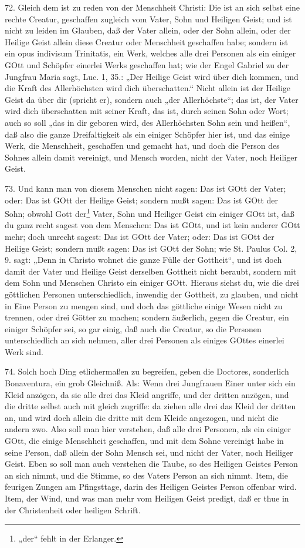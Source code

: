 72. Gleich dem ist zu reden von der Menschheit Christi: Die ist an sich selbst eine rechte Creatur, geschaffen zugleich vom Vater, Sohn und Heiligen Geist; und ist nicht zu leiden im Glauben, daß der Vater allein, oder der Sohn allein, oder der Heilige Geist allein diese Creatur oder Menschheit geschaffen habe; sondern ist ein opus indivisum Trinitatis, ein Werk, welches alle drei Personen als ein einiger GOtt und Schöpfer einerlei Werks geschaffen hat; wie der Engel Gabriel zu der Jungfrau Maria sagt, Luc. 1, 35.: „Der Heilige Geist wird über dich kommen, und die Kraft des Allerhöchsten wird dich überschatten.“ Nicht allein ist der Heilige Geist da über dir (spricht er), sondern auch „der Allerhöchste“; das ist, der Vater wird dich überschatten mit seiner Kraft, das ist, durch seinen Sohn oder Wort; auch so soll „das in dir geboren wird, des Allerhöchsten Sohn sein und heißen“, daß also die ganze Dreifaltigkeit als ein einiger Schöpfer hier ist, und das einige Werk, die Menschheit, geschaffen und gemacht hat, und doch die Person des Sohnes allein damit vereinigt, und Mensch worden, nicht der Vater, noch Heiliger Geist.

73. Und kann man von diesem Menschen nicht sagen: Das ist GOtt der Vater; oder: Das ist GOtt der Heilige Geist; sondern mußt sagen: Das ist GOtt der Sohn; obwohl Gott der\footnote{„der“ fehlt in der Erlanger.} Vater, Sohn und Heiliger Geist ein einiger GOtt ist, daß du ganz recht sagest von dem Menschen: Das ist GOtt, und ist kein anderer GOtt mehr; doch unrecht sagest: Das ist GOtt der Vater; oder: Das ist GOtt der Heilige Geist; sondern mußt sagen: Das ist GOtt der Sohn; wie St. Paulus Col. 2, 9. sagt: „Denn in Christo wohnet die ganze Fülle der Gottheit“, und ist doch damit der Vater und Heilige Geist derselben Gottheit nicht beraubt, sondern mit dem Sohn und Menschen Christo ein einiger GOtt. Hieraus siehst du, wie die drei göttlichen Personen unterschiedlich, inwendig der Gottheit, zu glauben, und nicht in Eine Person zu mengen sind, und doch das göttliche einige Wesen nicht zu trennen, oder drei Götter zu machen; sondern äußerlich, gegen die Creatur, ein einiger Schöpfer sei, so gar einig, daß auch die Creatur, so die Personen unterschiedlich an sich nehmen, aller drei Personen als einiges GOttes einerlei Werk sind.

74. Solch hoch Ding etlichermaßen zu begreifen, geben die Doctores, sonderlich Bonaventura, ein grob Gleichniß. Als: Wenn drei Jungfrauen Einer unter sich ein Kleid anzögen, da sie alle drei das Kleid angriffe, und der dritten anzögen, und die dritte selbst auch mit gleich zugriffe: da ziehen alle drei das Kleid der dritten an, und wird doch allein die dritte mit dem Kleide angezogen, und nicht die andern zwo. Also soll man hier verstehen, daß alle drei Personen, als ein einiger GOtt, die einige Menschheit geschaffen, und mit dem Sohne vereinigt habe in seine Person, daß allein der Sohn Mensch sei, und nicht der Vater, noch Heiliger Geist. Eben so soll man auch verstehen die Taube, so des Heiligen Geistes Person an sich nimmt, und die Stimme, so des Vaters Person an sich nimmt. Item, die feurigen Zungen am Pfingsttage, darin des Heiligen Geistes Person offenbar wird. Item, der Wind, und was man mehr vom Heiligen Geist predigt, daß er thue in der Christenheit oder heiligen Schrift.

